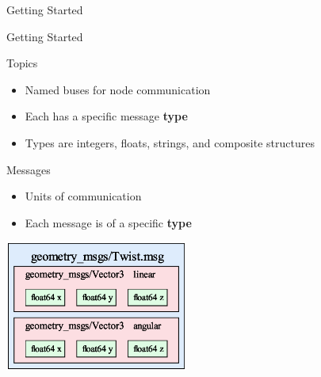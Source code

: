 \documentclass[9pt]{beamer}
\begin{document}
\begin{section}{Getting Started}
\begin{frame}{Getting Started}
\begin{block}{Topics}
            \begin{itemize}
                \item Named buses for node communication
                \item Each has a specific message \textbf{type}
                \item Types are integers, floats, strings, and composite structures
            \end{itemize} 
        \end{block}
        \begin{block}{Messages}
            \begin{itemize}
                \item Units of communication
                \item Each message is of a specific \textbf{type}
            \end{itemize} 
        \end{block}
            \includegraphics[width=0.45\textwidth,trim={0cm 0cm 0cm 0cm},clip]{img/ros_message.eps}
    \end{frame}
\end{section}
\end{document}
